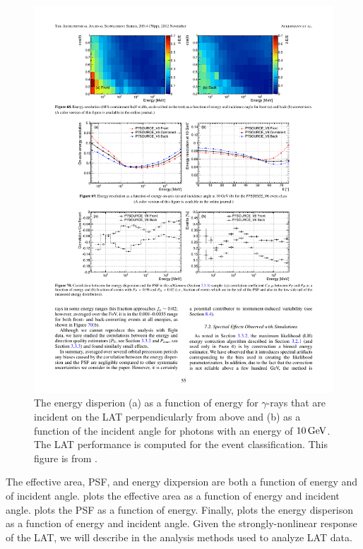 \begin{figure}[htbp]
  \centering
  \includegraphics{chapters/introduction/figures/lat_energy_dispersion.pdf}
  \caption{
  The energy disperion (a) as a function of energy for $\gamma$-rays that
  are incident on the \ac{LAT} perpendicularly from above and (b) as a function
  of the incident angle for photons with an energy of $10\,\text{GeV}$.
  The \ac{LAT} performance is computed for the \psevensourcevsix
  event classification.
  This figure is from \cite{ackermann_2012a_fermi-large}.
  }
\end{figure} 

The effective area, \ac{PSF}, and energy dixpersion are both a function
of energy and of incident angle.  
plots the effective area as a function of energy and incident angle.
 plots the \ac{PSF} as a function of energy.  Finally,
 plots the energy disperison as a function
of energy and incident angle.  Given the strongly-nonlinear response of
the \ac{LAT}, we will describe in 
the analysis methods used to analyze \ac{LAT} data.


